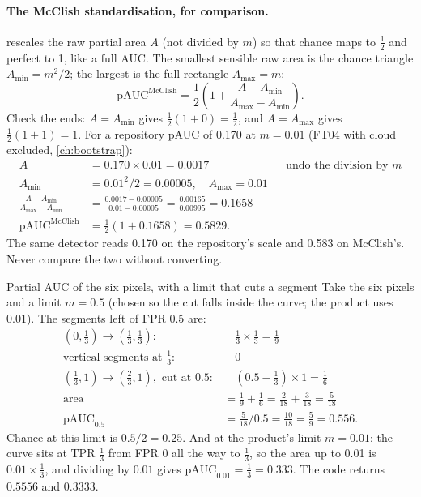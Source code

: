 \paragraph{The McClish standardisation, for comparison.} \citet{mcclish1989analyzing} rescales the raw partial
area $A$ (not divided by $m$) so that chance maps to $\frac12$ and perfect to 1, like a full AUC. The smallest
sensible raw area is the chance triangle $A_{\min} = m^2/2$; the largest is the full rectangle $A_{\max} = m$:
\begin{equation}\label{eq:measures:mcclish}
\mathrm{pAUC}^{\text{McClish}} = \frac12\left(1 + \frac{A - A_{\min}}{A_{\max} - A_{\min}}\right).
\end{equation}
Check the ends: $A = A_{\min}$ gives $\frac12(1 + 0) = \frac12$, and $A = A_{\max}$ gives $\frac12(1 + 1) = 1$.
For a repository pAUC of 0.170 at $m = 0.01$ (FT04 with cloud excluded, \cref{ch:bootstrap}):
\begin{align*}
A &= 0.170 \times 0.01 = 0.0017 && \text{undo the division by $m$}\\
A_{\min} &= 0.01^2 / 2 = 0.00005, \quad A_{\max} = 0.01\\
\frac{A - A_{\min}}{A_{\max} - A_{\min}} &= \frac{0.0017 - 0.00005}{0.01 - 0.00005} = \frac{0.00165}{0.00995} = 0.1658\\
\mathrm{pAUC}^{\text{McClish}} &= \tfrac12(1 + 0.1658) = 0.5829.
\end{align*}
The same detector reads 0.170 on the repository's scale and 0.583 on McClish's\tagC{}. Never compare the two
without converting.

\begin{worked}[label={we:measures:pauc}]{Partial AUC of the six pixels, with a limit that cuts a segment}
Take the six pixels and a limit $m = 0.5$ (chosen so the cut falls inside the curve; the product uses 0.01). The
segments left of FPR 0.5 are:
\begin{align*}
(0, \tfrac13) \to (\tfrac13, \tfrac13): &\quad \tfrac13 \times \tfrac13 = \tfrac19\\
\text{vertical segments at } \tfrac13: &\quad 0\\
(\tfrac13, 1) \to (\tfrac23, 1), \text{ cut at } 0.5: &\quad (0.5 - \tfrac13) \times 1 = \tfrac16\\
\text{area} &= \tfrac19 + \tfrac16 = \tfrac{2}{18} + \tfrac{3}{18} = \tfrac{5}{18}\\
\mathrm{pAUC}_{0.5} &= \tfrac{5}{18} / 0.5 = \tfrac{10}{18} = \tfrac59 = 0.556.
\end{align*}
Chance at this limit is $0.5 / 2 = 0.25$. And at the product's limit $m = 0.01$: the curve sits at TPR $\frac13$ from
FPR 0 all the way to $\frac13$, so the area up to 0.01 is $0.01 \times \frac13$, and dividing by $0.01$ gives
$\mathrm{pAUC}_{0.01} = \frac13 = 0.333$. The code returns $0.5556$ and $0.3333$\tagC{}.
\end{worked}

